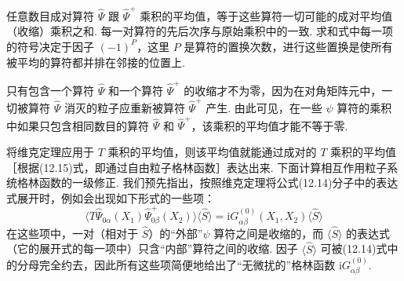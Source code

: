 任意数目成对算符 $\hat\Psi$ 跟 $\hat\Psi^{+}$ 乘积的平均值，等于这些算符一切可能的成对平均值（收缩）乘积之和. 每一对算符的先后次序与原始乘积中的一致. 求和式中每一项的符号决定于因子 $(-1)^P$，这里 $P$ 是算符的置换次数，进行这些置换是使所有被平均的算符都并排在邻接的位置上.

只有包含一个算符 $\hat\Psi$ 和一个算符 $\hat\Psi^{+}$ 的收缩才不为零，因为在对角矩阵元中，一切被算符 $\hat\Psi$ 消灭的粒子应重新被算符 $\hat\Psi^{+}$ 产生. 由此可见，在一些 $\psi$ 算符的乘积中如果只包含相同数目的算符 $\hat\Psi$ 和 $\hat\Psi^{+}$，该乘积的平均值才能不等于零.

将维克定理应用于 $T$ 乘积的平均值，则该平均值就能通过成对的 $T$ 乘积的平均值［根据(12.15)式，即通过自由粒子格林函数］表达出来. 下面计算相互作用粒子系统格林函数的一级修正. 我们预先指出，按照维克定理将公式(12.14)分子中的表达式展开时，例如会出现如下形式的一些项：
\begin{equation}
\big\langle T\hat\Psi_{0\alpha}(X_1)\hat\Psi^{+}_{0\beta}(X_2)\big\rangle\langle\hat S\rangle=\mathrm{i}G^{(0)}_{\alpha\beta}(X_1,X_2)\langle\hat S\rangle
\end{equation}
在这些项中，一对（相对于 $\hat S$）的“外部”$\psi$ 算符之间是收缩的，而 $\langle\hat S\rangle$ 的表达式（它的展开式的每一项中）只含“内部”算符之间的收缩. 因子 $\langle\hat S\rangle$ 可被(12.14)式中的分母完全约去，因此所有这些项简便地给出了“无微扰的”格林函数 $\mathrm{i}G^{(0)}_{\alpha\beta}$.

